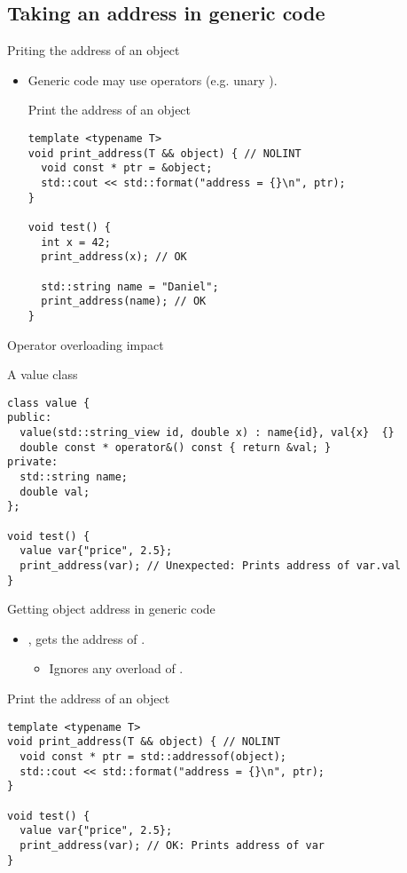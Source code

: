 \subsection{Taking an address in generic code}

\begin{frame}[t,fragile]{Priting the address of an object}
\begin{itemize}
  \item Generic code may use operators (e.g. unary \cppkey{\&}).

\begin{block}{Print the address of an object}
\begin{lstlisting}
template <typename T>
void print_address(T && object) { // NOLINT
  void const * ptr = &object;
  std::cout << std::format("address = {}\n", ptr);
}

void test() {
  int x = 42;
  print_address(x); // OK

  std::string name = "Daniel";
  print_address(name); // OK
}
\end{lstlisting}
\end{block}

\end{itemize}
\end{frame}

\begin{frame}[t,fragile]{Operator overloading impact}
\begin{block}{A value class}
\begin{lstlisting}
class value {
public:
  value(std::string_view id, double x) : name{id}, val{x}  {}
  double const * operator&() const { return &val; }
private:
  std::string name;
  double val;
};

void test() {
  value var{"price", 2.5};
  print_address(var); // Unexpected: Prints address of var.val
}
\end{lstlisting}
\end{block}
\end{frame}

\begin{frame}[t,fragile]{Getting object address in generic code}
\begin{itemize}
  \item {}, gets the address of .
    \begin{itemize}
      \item Ignores any overload of .
    \end{itemize}
\end{itemize}
\begin{block}{Print the address of an object}
\begin{lstlisting}
template <typename T>
void print_address(T && object) { // NOLINT
  void const * ptr = std::addressof(object);
  std::cout << std::format("address = {}\n", ptr);
}

void test() {
  value var{"price", 2.5};
  print_address(var); // OK: Prints address of var
}
\end{lstlisting}
\end{block}
\end{frame}
